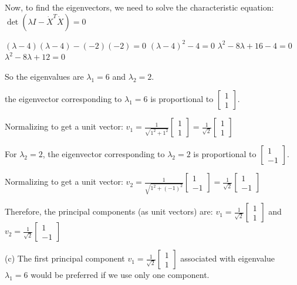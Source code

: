 Now, to find the eigenvectors, we need to solve the characteristic equation: $\det(\lambda I - \dot{X}^T\dot{X}) = 0$


$(\lambda-4)(\lambda-4) - (-2)(-2) = 0$ $(\lambda-4)^2 - 4 = 0$ $\lambda^2 - 8\lambda + 16 - 4 = 0$ \\
$\lambda^2 - 8\lambda + 12 = 0$

So the eigenvalues are $\lambda_1 = 6$ and $\lambda_2 = 2$.

the eigenvector corresponding to $\lambda_1 = 6$ is proportional to $\begin{bmatrix} 1 \\ 1 \end{bmatrix}$.

Normalizing to get a unit vector: $v_1 = \frac{1}{\sqrt{1^2 + 1^2}}\begin{bmatrix} 1 \\ 1 \end{bmatrix} = \frac{1}{\sqrt{2}}\begin{bmatrix} 1 \\ 1 \end{bmatrix}$

For $\lambda_2 = 2$, 
the eigenvector corresponding to $\lambda_2 = 2$ is proportional to $\begin{bmatrix} 1 \\ -1 \end{bmatrix}$.

Normalizing to get a unit vector: $v_2 = \frac{1}{\sqrt{1^2 + (-1)^2}}\begin{bmatrix} 1 \\ -1 \end{bmatrix} = \frac{1}{\sqrt{2}}\begin{bmatrix} 1 \\ -1 \end{bmatrix}$

Therefore, the principal components (as unit vectors) are: $v_1 = \frac{1}{\sqrt{2}}\begin{bmatrix} 1 \\ 1 \end{bmatrix}$ and $v_2 = \frac{1}{\sqrt{2}}\begin{bmatrix} 1 \\ -1 \end{bmatrix}$

(c) 
The first principal component $v_1 = \frac{1}{\sqrt{2}}\begin{bmatrix} 1 \\ 1 \end{bmatrix}$ associated with eigenvalue $\lambda_1 = 6$ would be preferred if we use only one component.

